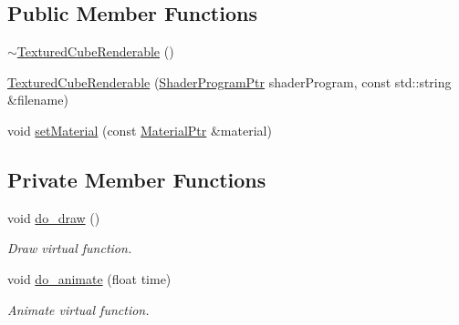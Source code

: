 \subsection*{Public Member Functions}
\begin{DoxyCompactItemize}
\item 
\hyperlink{classTexturedCubeRenderable_aa61796332480a92a13ae632903b1d62d}{$\sim$\+Textured\+Cube\+Renderable} ()
\item 
\hyperlink{classTexturedCubeRenderable_aad6e3678cbada6155e7a9d0bc6657468}{Textured\+Cube\+Renderable} (\hyperlink{ShaderProgram_8hpp_af8e4af1ad4c53875ee5d32ab7e1f4966}{Shader\+Program\+Ptr} shader\+Program, const std\+::string \&filename)
\item 
void \hyperlink{classTexturedCubeRenderable_aac08e07a1c5815e0843f63d08cea1c3f}{set\+Material} (const \hyperlink{Material_8hpp_a1d47cd05ca683e287435cf0b363fbfe1}{Material\+Ptr} \&material)
\end{DoxyCompactItemize}
\subsection*{Private Member Functions}
\begin{DoxyCompactItemize}
\item 
void \hyperlink{classTexturedCubeRenderable_a014828d1aa179b991a63d362f9d295e6}{do\+\_\+draw} ()
\begin{DoxyCompactList}\small\item\em Draw virtual function. \end{DoxyCompactList}\item 
void \hyperlink{classTexturedCubeRenderable_a8c48dedcd36a690591de101e2288cb0a}{do\+\_\+animate} (float time)
\begin{DoxyCompactList}\small\item\em Animate virtual function. \end{DoxyCompactList}\end{DoxyCompactItemize}
